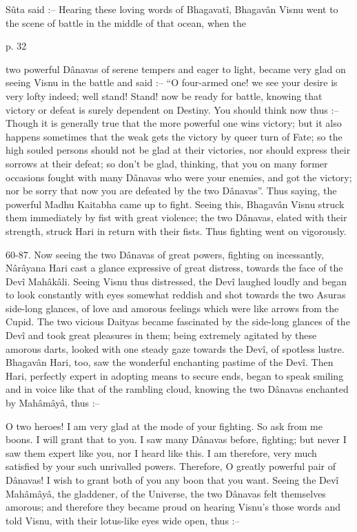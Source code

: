 

Sûta said :-- Hearing these loving words of Bhagavatî, Bhagavân Visnu went to the scene of battle in the middle of that ocean, when the

 

p. 32

 

two powerful Dânavas of serene tempers and eager to light, became very glad on seeing Visnu in the battle and said :-- “O four-armed one! we see your desire is very lofty indeed; well  stand! Stand! now be ready for battle, knowing that victory or defeat is surely dependent on Destiny. You should think now thus :-- Though it is generally true that the more powerful one wins victory; but it also happens sometimes that the weak gets the victory by queer turn of Fate; so the high souled persons should not be glad at their victories, nor should express their sorrows at their defeat; so don’t be glad, thinking, that you on many former occasions fought with many Dânavas who were your enemies, and got the victory; nor be sorry that now you are defeated by the two Dânavas”. Thus saying, the powerful Madhu Kaitabha came up to fight. Seeing this, Bhagavân Visnu struck them immediately by fist with great violence; the two Dânavas, elated with their strength, struck Hari in return with their fists. Thus fighting went on vigorously.

 

60-87. Now seeing the two Dânavas of great powers, fighting on incessantly, Nârâyana Hari cast a glance expressive of great distress, towards the face of the Devî Mahâkâli. Seeing Visnu thus distressed, the Devî laughed loudly and began to look constantly with eyes somewhat reddish and shot towards the two Asuras side-long glances, of love and amorous feelings which were like arrows from the Cupid. The two vicious Daityas became fascinated by the side-long glances of the Devî and took great pleasures in them; being extremely agitated by these amorous darts, looked with one steady gaze towards the Devî, of spotless lustre. Bhagavân Hari, too, saw the wonderful enchanting pastime of the Devî. Then Hari, perfectly expert in adopting means to secure ends, began to speak smiling and in voice like that of the rambling cloud, knowing the two Dânavas enchanted by Mahâmâyâ, thus :--

 

O two heroes! I am very glad at the mode of your fighting. So ask from me boons. I will grant that to you. I saw many Dânavas before, fighting; but never I saw them expert like you, nor I heard like this. I am therefore, very much satisfied by your such unrivalled powers. Therefore, O greatly powerful pair of Dânavas! I wish to grant both of you any boon that you want. Seeing the Devî Mahâmâyâ, the gladdener, of the Universe, the two Dânavas felt themselves amorous; and therefore they became proud on hearing Visnu's those words and told Visnu, with their lotus-like eyes wide open, thus :--

